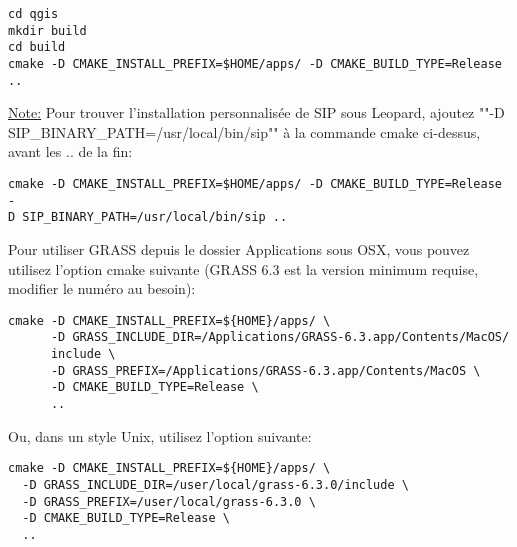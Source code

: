 \begin{verbatim}
cd qgis
mkdir build
cd build
cmake -D CMAKE_INSTALL_PREFIX=$HOME/apps/ -D CMAKE_BUILD_TYPE=Release ..
\end{verbatim}

\underline{Note:} Pour trouver l'installation personnalis\'ee de SIP sous Leopard, ajoutez ""-D SIP\_BINARY\_PATH=/usr/local/bin/sip"" \`a la commande cmake ci-dessus, avant les .. de la fin:

\begin{verbatim}
cmake -D CMAKE_INSTALL_PREFIX=$HOME/apps/ -D CMAKE_BUILD_TYPE=Release -
D SIP_BINARY_PATH=/usr/local/bin/sip ..
\end{verbatim}

Pour utiliser GRASS depuis le dossier Applications sous OSX, vous pouvez utilisez l'option cmake suivante (GRASS 6.3 est la version minimum requise, modifier le num\'ero au besoin):

\begin{verbatim}
cmake -D CMAKE_INSTALL_PREFIX=${HOME}/apps/ \
      -D GRASS_INCLUDE_DIR=/Applications/GRASS-6.3.app/Contents/MacOS/
      include \
      -D GRASS_PREFIX=/Applications/GRASS-6.3.app/Contents/MacOS \
      -D CMAKE_BUILD_TYPE=Release \
      ..
\end{verbatim}

Ou, dans un style Unix, utilisez l'option suivante:

\begin{verbatim}
cmake -D CMAKE_INSTALL_PREFIX=${HOME}/apps/ \
  -D GRASS_INCLUDE_DIR=/user/local/grass-6.3.0/include \
  -D GRASS_PREFIX=/user/local/grass-6.3.0 \
  -D CMAKE_BUILD_TYPE=Release \
  ..
\end{verbatim}

